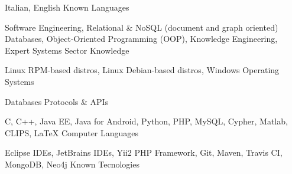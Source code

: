 

\begin{cventries}

  \cventry
    {Italian, English}
    {Known Languages}
    {}
    {}
    {}

  \cventry
    {Software Engineering, Relational \& NoSQL (document and graph oriented) Databases, Object-Oriented Programming (OOP), Knowledge Engineering, Expert Systems}
    {Sector Knowledge}
    {}
    {}
    {}

  \cventry
    {Linux RPM-based distros, Linux Debian-based distros, Windows}
    {Operating Systems}
    {}
    {}
    {}

  \cventry
    {Databases}
    {Protocols \& APIs}
    {}
    {}
    {}

  \cventry
    {C, C++, Java EE, Java for Android, Python, PHP, MySQL, Cypher, Matlab, CLIPS, LaTeX}
    {Computer Languages}
    {}
    {}
    {}

  \cventry
    {Eclipse IDEs, JetBrains IDEs, Yii2 PHP Framework, Git, Maven, Travis CI, MongoDB, Neo4j}
    {Known Tecnologies}
    {}
    {}
    {}

\end{cventries}

